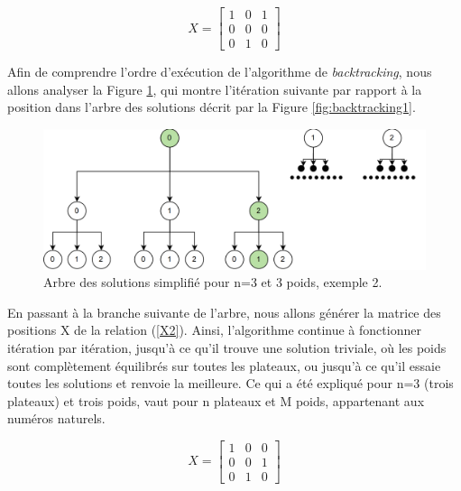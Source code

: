 \documentclass[12pt]{article} %
\begin{document}
\vfill

\begin{equation}
           X = \begin{bmatrix}
            1 & 0 & 1 \\
            0 & 0 & 0 \\
            0 & 1 & 0
            \end{bmatrix} 
            \label{X1}
\end{equation}

\vfill

Afin de comprendre l'ordre d'exécution de l'algorithme de \textit{backtracking}, nous allons analyser la Figure \ref{fig:backtracking2}, qui montre l'itération suivante par rapport à la position dans l'arbre des solutions décrit par la Figure \ref{fig:backtracking1}. 

\vfill

\FloatBarrier
\begin{figure}[!h]
\centering
\includegraphics[width = 0.66\linewidth]{diagram/backtracking2.png}
\caption{Arbre des solutions simplifié pour n=3 et 3 poids, exemple 2.}
\label{fig:backtracking2}
\end{figure}
\FloatBarrier

\vfill

En passant à la branche suivante de l'arbre, nous allons générer la matrice des positions X de la relation (\ref{X2}). Ainsi, l'algorithme continue à fonctionner itération par itération, jusqu'à ce qu'il trouve une solution triviale, où les poids sont complètement équilibrés sur toutes les plateaux, ou jusqu'à ce qu'il essaie toutes les solutions et renvoie la meilleure. Ce qui a été expliqué pour n=3 (trois plateaux) et trois poids, vaut pour n plateaux et M poids, appartenant aux numéros naturels. 

\begin{equation}
           X = \begin{bmatrix}
            1 & 0 & 0 \\
            0 & 0 & 1 \\
            0 & 1 & 0
            \end{bmatrix} 
            \label{X2}
\end{equation}
\end{document}
